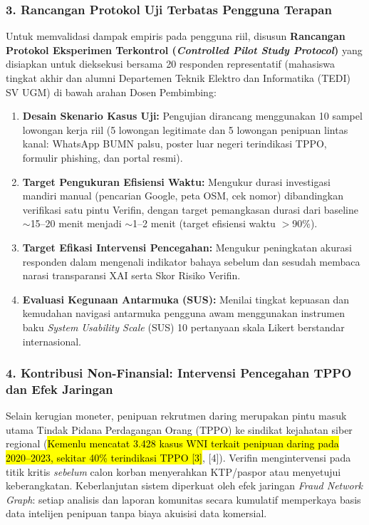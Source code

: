 \documentclass[12pt,a4paper]{article}
\newcommand{\revisi}[1]{\hl{#1}}
\newenvironment{sorotkuning}{%
  \begin{tcolorbox}[
    breakable,
    enhanced,
    frame hidden,
    boxrule=0pt,
    arc=0mm,
    sharp corners,
    colback=yellow!22,
    left=1.5mm, right=1.5mm, top=1.0mm, bottom=1.0mm,
    before skip=1.5pt, after skip=1.5pt
  ]%
}{%
  \end{tcolorbox}%
}
\begin{document}
\begin{sorotkuning}
\subsubsection*{3. Rancangan Protokol Uji Terbatas Pengguna Terapan}
Untuk memvalidasi dampak empiris pada pengguna riil, disusun \textbf{Rancangan Protokol Eksperimen Terkontrol (\textit{Controlled Pilot Study Protocol})} yang disiapkan untuk dieksekusi bersama 20 responden representatif (mahasiswa tingkat akhir dan alumni Departemen Teknik Elektro dan Informatika (TEDI) SV UGM) di bawah arahan Dosen Pembimbing:
\begin{enumerate}[label=\textbf{\alph*.}, leftmargin=*, labelindent=0.65cm, labelsep=0.5em]
\item \textbf{Desain Skenario Kasus Uji:} Pengujian dirancang menggunakan 10 sampel lowongan kerja riil (5 lowongan legitimate dan 5 lowongan penipuan lintas kanal: WhatsApp BUMN palsu, poster luar negeri terindikasi TPPO, formulir phishing, dan portal resmi).
\item \textbf{Target Pengukuran Efisiensi Waktu:} Mengukur durasi investigasi mandiri manual (pencarian Google, peta OSM, cek nomor) dibandingkan verifikasi satu pintu Verifin, dengan target pemangkasan durasi dari baseline $\sim$15--20 menit menjadi $\sim$1--2 menit (target efisiensi waktu $>$90\%).
\item \textbf{Target Efikasi Intervensi Pencegahan:} Mengukur peningkatan akurasi responden dalam mengenali indikator bahaya sebelum dan sesudah membaca narasi transparansi XAI serta Skor Risiko Verifin.
\item \textbf{Evaluasi Kegunaan Antarmuka (SUS):} Menilai tingkat kepuasan dan kemudahan navigasi antarmuka pengguna awam menggunakan instrumen baku \textit{System Usability Scale} (SUS) 10 pertanyaan skala Likert berstandar internasional.
\end{enumerate}
\end{sorotkuning}

\begin{sorotkuning}
\subsubsection*{4. Kontribusi Non-Finansial: Intervensi Pencegahan TPPO dan Efek Jaringan}
Selain kerugian moneter, penipuan rekrutmen daring merupakan pintu masuk utama Tindak Pidana Perdagangan Orang (TPPO)
ke sindikat kejahatan siber regional (\revisi{Kemenlu mencatat 3.428 kasus WNI terkait penipuan daring pada 2020--2023, sekitar 40\% terindikasi TPPO [3]}, [4]). Verifin
mengintervensi pada titik kritis \textit{sebelum} calon korban menyerahkan KTP/paspor atau menyetujui keberangkatan.
Keberlanjutan sistem diperkuat oleh efek jaringan \textit{Fraud Network Graph}: setiap analisis dan laporan komunitas
secara kumulatif memperkaya basis data intelijen penipuan tanpa biaya akuisisi data komersial.
\end{sorotkuning}
\end{document}
